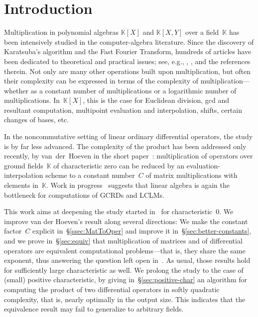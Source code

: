 \documentclass{sig-alt-full}
\newcommand{\x}{X}
\newcommand{\y}{Y}
\newcommand{\bK}{\mathbb{K}}
\begin{document}
\section{Introduction}

Multiplication in polynomial algebras $\bK[\x]$ and $\bK[\x,\y]$ over a field~$\bK$ has been intensively studied in the computer-algebra literature.
Since the discovery of Karatsuba's algorithm and the Fast Fourier Transform, hundreds of articles have been dedicated to theoretical and practical issues;
see, e.g., \cite[Ch.~8]{GaGe99}, \cite{Bernstein}, and the references therein.
Not only are many other operations built upon multiplication, but often their complexity can be expressed in terms of the complexity of multiplication---whether as a constant number of multiplications or a logarithmic number of multiplications.
In~$\bK[\x]$, this is the case for Euclidean division, gcd and resultant computation, multipoint evaluation and interpolation, shifts, certain changes of bases, etc.

In the noncommutative setting of linear ordinary differential operators, the study is by far less advanced.
The complexity of the product has been addressed only recently, by van~der~Hoeven in the short paper~\cite{vdHoeven02}:
multiplication of operators over ground fields~$\bK$ of characteristic zero can be reduced by an evaluation-interpolation scheme to a constant number~$C$ of matrix multiplications with elements in~$\bK$.
Work in progress~\cite{LCLMs} suggests that linear algebra is again the bottleneck for computations of GCRDs and LCLMs.

This work aims at deepening the study started in~\cite{vdHoeven02} for characteristic~0.
We improve van der Hoeven's result along several directions:
We make the constant factor~$C$ explicit in~\S\ref{ssec:MatToOper} and improve it in~\S\ref{sec:better-constants}, and we prove in~\S\ref{sec:equiv} that multiplication of matrices and of differential operators are equivalent computational problems---that is, they share the same exponent, 
thus answering the question left open in~\cite[\S6, Remark~2]{vdHoeven02}.
As usual, those results hold for sufficiently large characteristic as well.
We prolong the study to the case of (small) positive characteristic, by giving in~\S\ref{sec:positive-char} an algorithm for computing the product of two differential operators in softly quadratic complexity, that is, nearly optimally in the output size.
This indicates that the equivalence result may fail to generalize to arbitrary fields.
\end{document}
